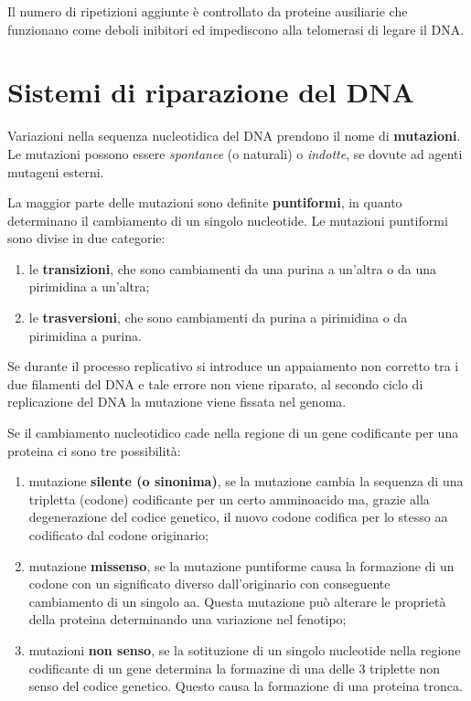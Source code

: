 \documentclass[11pt]{book}
\begin{document}
Il numero di ripetizioni aggiunte è controllato da proteine ausiliarie
che funzionano come deboli inibitori ed impediscono alla telomerasi di
legare il DNA.

\chapter{Sistemi di riparazione del
DNA}\label{sistemi-di-riparazione-del-dna}

Variazioni nella sequenza nucleotidica del DNA prendono il nome di
\textbf{mutazioni}. Le mutazioni possono essere \emph{spontanee} (o
naturali) o \emph{indotte}, se dovute ad agenti mutageni esterni.

La maggior parte delle mutazioni sono definite \textbf{puntiformi}, in
quanto determinano il cambiamento di un singolo nucleotide. Le mutazioni
puntiformi sono divise in due categorie:

\begin{enumerate}
\def\labelenumi{\arabic{enumi}.}
\itemsep1pt\parskip0pt
\item
  le \textbf{transizioni}, che sono cambiamenti da una purina a un'altra
  o da una pirimidina a un'altra;
\item
  le \textbf{trasversioni}, che sono cambiamenti da purina a pirimidina
  o da pirimidina a purina.
\end{enumerate}

Se durante il processo replicativo si introduce un appaiamento non
corretto tra i due filamenti del DNA e tale errore non viene riparato,
al secondo ciclo di replicazione del DNA la mutazione viene fissata nel
genoma.

Se il cambiamento nucleotidico cade nella regione di un gene codificante
per una proteina ci sono tre possibilità:

\begin{enumerate}
\def\labelenumi{\arabic{enumi}.}
\itemsep1pt\parskip0pt
\item
  mutazione \textbf{silente (o sinonima)}, se la mutazione cambia la
  sequenza di una tripletta (codone) codificante per un certo
  amminoacido ma, grazie alla degenerazione del codice genetico, il
  nuovo codone codifica per lo stesso aa codificato dal codone
  originario;
\item
  mutazione \textbf{missenso}, se la mutazione puntiforme causa la
  formazione di un codone con un significato diverso dall'originario con
  conseguente cambiamento di un singolo aa. Questa mutazione può
  alterare le proprietà della proteina determinando una variazione nel
  fenotipo;
\item
  mutazioni \textbf{non senso}, se la sotituzione di un singolo
  nucleotide nella regione codificante di un gene determina la formazine
  di una delle 3 triplette non senso del codice genetico. Questo causa
  la formazione di una proteina tronca.
\end{enumerate}
\end{document}
